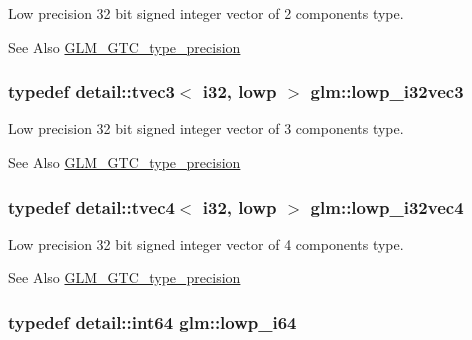 Low precision 32 bit signed integer vector of 2 components type. \begin{DoxySeeAlso}{See Also}
\hyperlink{group__gtc__type__precision}{G\-L\-M\-\_\-\-G\-T\-C\-\_\-type\-\_\-precision} 
\end{DoxySeeAlso}
\hypertarget{group__gtc__type__precision_gaa4a0dd64d4253a3641225254670c7b95}{
\subsubsection[{lowp\-\_\-i32vec3}]{\setlength{\rightskip}{0pt plus 5cm}typedef detail\-::tvec3$<$ i32, lowp $>$ {\bf glm\-::lowp\-\_\-i32vec3}}}\label{group__gtc__type__precision_gaa4a0dd64d4253a3641225254670c7b95}
Low precision 32 bit signed integer vector of 3 components type. \begin{DoxySeeAlso}{See Also}
\hyperlink{group__gtc__type__precision}{G\-L\-M\-\_\-\-G\-T\-C\-\_\-type\-\_\-precision} 
\end{DoxySeeAlso}
\hypertarget{group__gtc__type__precision_ga99adefeda08a56345b0553d13283d2fa}{
\subsubsection[{lowp\-\_\-i32vec4}]{\setlength{\rightskip}{0pt plus 5cm}typedef detail\-::tvec4$<$ i32, lowp $>$ {\bf glm\-::lowp\-\_\-i32vec4}}}\label{group__gtc__type__precision_ga99adefeda08a56345b0553d13283d2fa}
Low precision 32 bit signed integer vector of 4 components type. \begin{DoxySeeAlso}{See Also}
\hyperlink{group__gtc__type__precision}{G\-L\-M\-\_\-\-G\-T\-C\-\_\-type\-\_\-precision} 
\end{DoxySeeAlso}
\hypertarget{group__gtc__type__precision_ga1f4ded25f71c0f3b4518936d50b54b6e}{
\subsubsection[{lowp\-\_\-i64}]{\setlength{\rightskip}{0pt plus 5cm}typedef detail\-::int64 {\bf glm\-::lowp\-\_\-i64}}}\label{group__gtc__type__precision_ga1f4ded25f71c0f3b4518936d50b54b6e}
